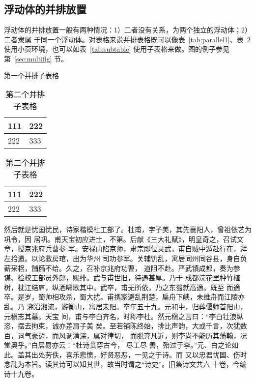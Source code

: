 \subsection{浮动体的并排放置}
浮动体的并排放置一般有两种情况：1）二者没有关系，为两个独立的浮动体；2）二者隶属
于同一个浮动体。对表格来说并排表格既可以像表~\ref{tab:parallel1}、表~\ref{tab:parallel2}
使用小页环境，也可以如表~\ref{tab:subtable} 使用子表格来做。图的例子参见第~\ref{sec:multifig} 节。
\begin{table}[h]
\noindent\begin{minipage}{0.5\textwidth}
\centering
\caption{第一个并排子表格}
\label{tab:parallel1}
\begin{tabular}{p{2cm}p{2cm}}
\toprule[1.5pt]
111 & 222 \\\midrule[1pt]
222 & 333 \\\bottomrule[1.5pt]
\end{tabular}
\end{minipage}
\begin{minipage}{0.5\textwidth}
\centering
\caption{第二个并排子表格}
\label{tab:parallel2}
\begin{tabular}{p{2cm}p{2cm}}
\toprule[1.5pt]
111 & 222 \\\midrule[1pt]
222 & 333 \\\bottomrule[1.5pt]
\end{tabular}
\end{minipage}
\end{table}

然后就是忧国忧民，诗家楷模杜工部了。杜甫，字子美，其先襄阳人，曾祖依艺为巩令，因
居巩。甫天宝初应进士，不第。后献《三大礼赋》，明皇奇之，召试文章，授京兆府兵曹参
军。安禄山陷京师，肃宗即位灵武，甫自贼中遁赴行在，拜左拾遗。以论救房琯，出为华州
司功参军。关辅饥乱，寓居同州同谷县，身自负薪采梠，餔糒不给。久之，召补京兆府功曹，
道阻不赴。严武镇成都，奏为参谋、检校工部员外郎，赐绯。武与甫世旧，待遇甚厚。乃于
成都浣花里种竹植树，枕江结庐，纵酒啸歌其中。武卒，甫无所依，乃之东蜀就高適。既至
而適卒。是岁，蜀帅相攻杀，蜀大扰。甫携家避乱荆楚，扁舟下峡，未维舟而江陵亦乱。乃
溯沿湘流，游衡山，寓居耒阳。卒年五十九。元和中，归葬偃师首阳山，元稹志其墓。天宝
间，甫与李白齐名，时称李杜。然元稹之言曰：“李白壮浪纵恣，摆去拘束，诚亦差肩子美
矣。至若铺陈终始，排比声韵，大或千言，次犹数百，词气豪迈，而风调清深，属对律切，
而脱弃凡近，则李尚不能历其藩翰，况堂奥乎。”白居易亦云：“杜诗贯穿古今，  尽工尽
善，殆过于李。”元、白之论如此。盖其出处劳佚，喜乐悲愤，好贤恶恶，一见之于诗。而
又以忠君忧国、伤时念乱为本旨。读其诗可以知其世，故当时谓之“诗史”。旧集诗文共六
十卷，今编诗十九卷。

